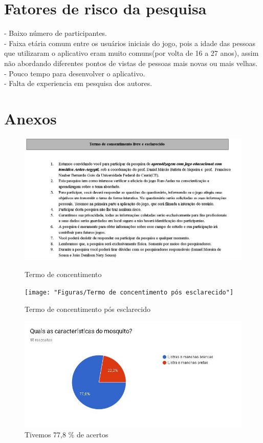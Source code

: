 \documentclass[12pt]{article}
\begin{document}
	\section{Fatores de risco da pesquisa}
		- Baixo número de participantes.\\
		- Faixa etária comum entre os usuários iniciais do jogo, pois a idade das pessoas que utilizaram o aplicativo eram muito comuns(por volta de 16 a 27 anos), assim não abordando diferentes pontos de vistas de pessoas mais novas ou mais velhas.\\
		- Pouco tempo para desenvolver o aplicativo.\\
		- Falta de experiencia em pesquisa dos autores.\\
		
	\section{Anexos} 
	\begin{figure}[H]
		\centering
		\caption{Termo de concentimento}
		\includegraphics[width=0.7\linewidth]{"Figuras/Termo de concentimento"}
		\label{fig:termo-de-concentimento}
	\end{figure}

	\begin{figure}[H]
		\centering
		\caption{Termo de concentimento pós esclarecido}
		\texttt{[image: "Figuras/Termo de concentimento pós esclarecido"]}
		\label{fig:termo-de-concentimento-pos-esclarecido}
	\end{figure}
	
	\begin{figure}[H]
		\centering
		\caption{Tivemos 77,8 \% de acertos}
		\includegraphics[width=0.7\linewidth]{Figuras/Pergunta_1}
		
		\label{fig:pergunta1}
	\end{figure}
	
\end{document}
